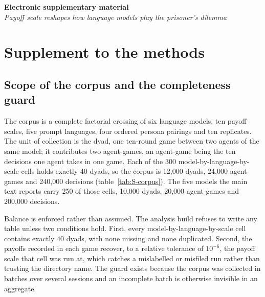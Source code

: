 \documentclass[openacc]{rsproca_new}
\begin{document}
\begin{center}
  {\LARGE\bfseries Electronic supplementary material}\\[6pt]
  {\large\itshape Payoff scale reshapes how language models play the
   prisoner's dilemma}
\end{center}
\vspace{1.5em}

\appendix



\section{Supplement to the methods}\label{appendix:methodology}

\subsection{Scope of the corpus and the completeness guard}\label{appendix:corpus}

The corpus is a complete factorial crossing of six language models, ten payoff
scales, five prompt languages, four ordered persona pairings and ten
replicates. The unit of collection is the dyad, one ten-round game between two
agents of the same model; it contributes two agent-games, an agent-game being
the ten decisions one agent takes in one game. Each of the 300
model-by-language-by-scale cells holds exactly 40 dyads, so the corpus is
12{,}000 dyads, 24{,}000 agent-games and 240{,}000 decisions
(table~\ref{tab:S-corpus}). The five models the main text reports carry 250 of
those cells, 10{,}000 dyads, 20{,}000 agent-games and 200{,}000 decisions.

Balance is enforced rather than assumed. The analysis build refuses to write
any table unless two conditions hold. First, every model-by-language-by-scale
cell contains exactly 40 dyads, with none missing and none duplicated. Second,
the payoffs recorded in each game recover, to a relative tolerance of $10^{-6}$,
the payoff scale that cell was run at, which catches a mislabelled or
misfiled run rather than trusting the directory name. The guard exists because
the corpus was collected in batches over several sessions and an incomplete
batch is otherwise invisible in an aggregate.
\end{document}
